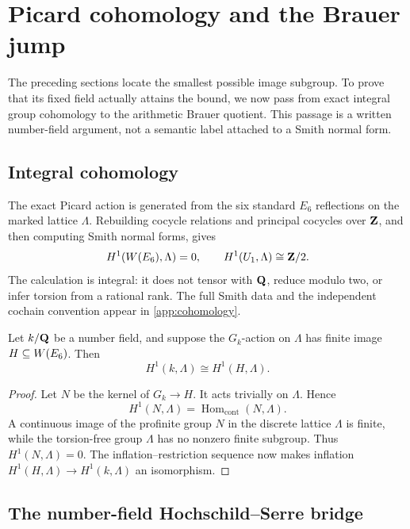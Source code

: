\section{Picard cohomology and the Brauer jump}
\label{sec:brauer-jump}

The preceding sections locate the smallest possible image subgroup.  To prove
that its fixed field actually attains the bound, we now pass from exact
integral group cohomology to the arithmetic Brauer quotient.  This passage is
a written number-field argument, not a semantic label attached to a Smith
normal form.

\subsection{Integral cohomology}

The exact Picard action is generated from the six standard \(E_6\)
reflections on the marked lattice \(\Lambda\).  Rebuilding cocycle relations
and principal cocycles over \(\mathbf Z\), and then computing Smith normal forms,
gives
\begin{equation}
 H^1(W(E_6),\Lambda)=0,\qquad
 H^1(U_1,\Lambda)\cong\mathbf Z/2.
\label{eq:exact-H1}
\end{equation}
The calculation is integral: it does not tensor with \(\mathbf Q\), reduce modulo
two, or infer torsion from a rational rank.  The full Smith data and the
independent cochain convention appear in \cref{app:cohomology}.

\begin{lemma}
\label{lem:inflation}
Let \(k/\mathbf Q\) be a number field, and suppose the \(G_k\)-action on \(\Lambda\)
has finite image \(H\subseteq W(E_6)\).  Then
\[
 H^1(k,\Lambda)\cong H^1(H,\Lambda).
\]
\end{lemma}

\begin{proof}
Let \(N\) be the kernel of \(G_k\to H\).  It acts trivially on \(\Lambda\).
Hence
\[
 H^1(N,\Lambda)=\operatorname{Hom}_{\mathrm{cont}}(N,\Lambda).
\]
A continuous image of the profinite group \(N\) in the discrete lattice
\(\Lambda\) is finite, while the torsion-free group \(\Lambda\) has no
nonzero finite subgroup.  Thus \(H^1(N,\Lambda)=0\).  The
inflation--restriction sequence now makes inflation
\(H^1(H,\Lambda)\to H^1(k,\Lambda)\) an isomorphism.
\end{proof}

\subsection{The number-field Hochschild--Serre bridge}

